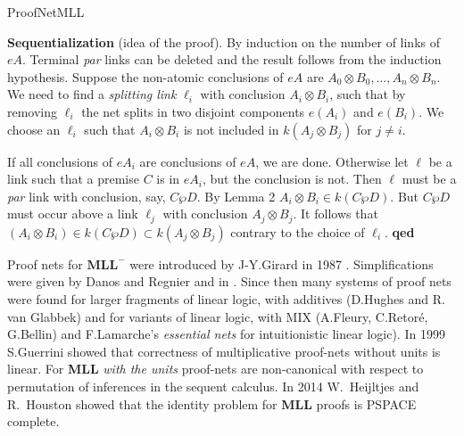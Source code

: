 \begin{entry}{ProofNetMLL}
\begin{clarifications}
\vspace{1ex}

\noindent
{\bf Sequentialization} (idea of the proof). By induction on the number of links of $eA$. 
Terminal \emph{par} links can be deleted and the result follows from the induction hypothesis. 
Suppose the non-atomic conclusions of $eA$ are $A_0\otimes B_0, \ldots, A_n\otimes B_n$.  
We need to find a \emph{splitting link} $\ell_i$ with conclusion  $A_i \otimes B_i$, such that by removing $\ell_i$ the net splits in two disjoint components  $e(A_i)$ and $e(B_i)$. 
We choose an $\ell_i$ such that  $A_i\otimes B_i$ is not included in $k(A_j\otimes B_j)$ for $j\neq i$. 

\vspace{1ex}

\noindent
If all conclusions of $eA_i$  are conclusions of $eA$, we are done.
Otherwise let $\ell$ be a link such that a premise $C$ is in $eA_i$, but 
the conclusion is not. Then $\ell$ must be a \emph{par} link with conclusion, say, $C \wp D$. 
By Lemma 2 $A_i\otimes B_i \in k(C\wp D)$.  But $C\wp D$ must occur above a link 
$\ell_j$ with conclusion $A_j\otimes B_j$. It follows that 
$(A_i\otimes B_i) \in k(C\wp D) \subset k(A_j\otimes B_j)$
contrary to the choice of $\ell_i$. {\bf qed}
\end{clarifications}

\begin{history}
Proof nets for $\mathbf{MLL}^-$ were introduced by J-Y.Girard in 1987 \cite{Girard}. 
Simplifications were given by Danos and Regnier \cite{DanosRegnier} and in \cite{BellinDeWiele}.  
Since then many systems of proof nets were found for larger fragments of linear logic, with additives (D.Hughes and R. van Glabbek) and for variants of linear logic, with MIX (A.Fleury, C.Retor\'e, G.Bellin) and F.Lamarche's \emph{essential nets} for intuitionistic linear logic). 
In 1999 S.Guerrini showed that correctness of multiplicative proof-nets without units is linear.
For {\bf MLL} \emph{with the units} proof-nets are non-canonical with respect to permutation of inferences in the sequent calculus. In 2014 W.~Heijltjes and R.~Houston showed that the identity problem for {\bf MLL} proofs is PSPACE complete. 
\end{history}



\end{entry}
